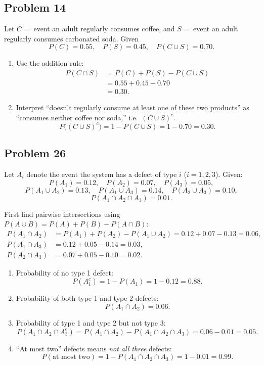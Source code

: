 \documentclass{article}
\begin{document}
\subsection*{Problem 14}

Let $C=$ event an adult regularly consumes coffee, and $S=$ event an adult regularly consumes carbonated soda.
Given
\[
P(C)=0.55,\quad P(S)=0.45,\quad P(C\cup S)=0.70.
\]

\begin{enumerate}
\item[(a)] Use the addition rule:
\begin{align*}
P(C\cap S)
&= P(C)+P(S)-P(C\cup S) \\
&= 0.55+0.45-0.70 \\
&= 0.30.
\end{align*}

\item[(b)] Interpret ``doesn't regularly consume at least one of these two products'' as ``consumes neither
    coffee nor soda,'' i.e.\ $(C\cup S)^c$.
\[
P\big((C\cup S)^c\big)=1-P(C\cup S)=1-0.70=0.30.
\]
\end{enumerate}

\subsection*{Problem 26}

Let $A_i$ denote the event the system has a defect of type $i$ ($i=1,2,3$). Given:
\[
P(A_1)=0.12,\quad P(A_2)=0.07,\quad P(A_3)=0.05,
\]
\[
P(A_1\cup A_2)=0.13,\quad P(A_1\cup A_3)=0.14,\quad P(A_2\cup A_3)=0.10,
\]
\[
P(A_1\cap A_2\cap A_3)=0.01.
\]

First find pairwise intersections using $P(A\cup B)=P(A)+P(B)-P(A\cap B)$:
\begin{align*}
P(A_1\cap A_2) &= P(A_1)+P(A_2)-P(A_1\cup A_2)=0.12+0.07-0.13=0.06,\\
P(A_1\cap A_3) &= 0.12+0.05-0.14=0.03,\\
P(A_2\cap A_3) &= 0.07+0.05-0.10=0.02.
\end{align*}

\begin{enumerate}
\item[(a)] Probability of no type 1 defect:
\[
P(A_1^c)=1-P(A_1)=1-0.12=0.88.
\]

\item[(b)] Probability of both type 1 and type 2 defects:
\[
P(A_1\cap A_2)=0.06.
\]

\item[(c)] Probability of type 1 and type 2 but not type 3:
\[
P(A_1\cap A_2\cap A_3^c)=P(A_1\cap A_2)-P(A_1\cap A_2\cap A_3)=0.06-0.01=0.05.
\]

\item[(d)] ``At most two'' defects means \emph{not all three} defects:
\[
P(\text{at most two}) = 1 - P(A_1\cap A_2\cap A_3)=1-0.01=0.99.
\]
\end{enumerate}
\end{document}

